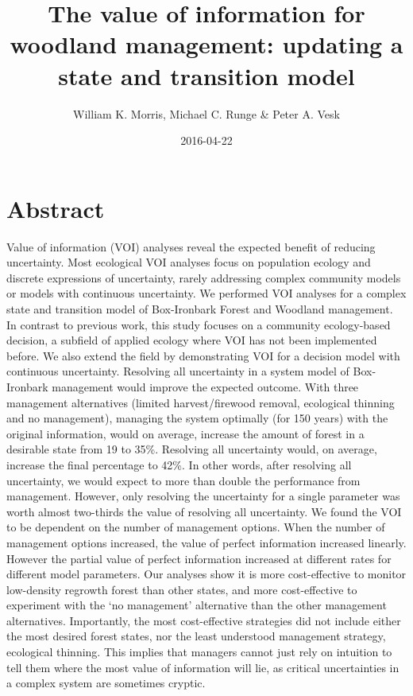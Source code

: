 \documentclass[]{article}
\title{The value of information for woodland management: updating a state and
transition model}
\author{William K. Morris, Michael C. Runge \& Peter A. Vesk}
\date{2016-04-22}
\begin{document}
\maketitle

\newpage

\section{Abstract}\label{abstract}

Value of information (VOI) analyses reveal the expected benefit of
reducing uncertainty. Most ecological VOI analyses focus on population
ecology and discrete expressions of uncertainty, rarely addressing
complex community models or models with continuous uncertainty. We
performed VOI analyses for a complex state and transition model of
Box-Ironbark Forest and Woodland management. In contrast to previous
work, this study focuses on a community ecology-based decision, a
subfield of applied ecology where VOI has not been implemented before.
We also extend the field by demonstrating VOI for a decision model with
continuous uncertainty. Resolving all uncertainty in a system model of
Box-Ironbark management would improve the expected outcome. With three
management alternatives (limited harvest/firewood removal, ecological
thinning and no management), managing the system optimally (for 150
years) with the original information, would on average, increase the
amount of forest in a desirable state from 19 to 35\%. Resolving all
uncertainty would, on average, increase the final percentage to 42\%. In
other words, after resolving all uncertainty, we would expect to more
than double the performance from management. However, only resolving the
uncertainty for a single parameter was worth almost two-thirds the value
of resolving all uncertainty. We found the VOI to be dependent on the
number of management options. When the number of management options
increased, the value of perfect information increased linearly. However
the partial value of perfect information increased at different rates
for different model parameters. Our analyses show it is more
cost-effective to monitor low-density regrowth forest than other states,
and more cost-effective to experiment with the `no management'
alternative than the other management alternatives. Importantly, the
most cost-effective strategies did not include either the most desired
forest states, nor the least understood management strategy, ecological
thinning. This implies that managers cannot just rely on intuition to
tell them where the most value of information will lie, as critical
uncertainties in a complex system are sometimes cryptic.
\end{document}
